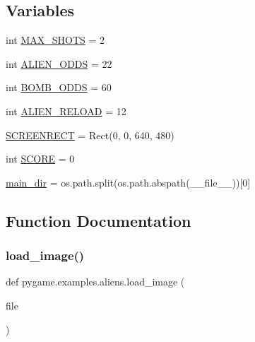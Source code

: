 \subsection*{Variables}
\begin{DoxyCompactItemize}
\item 
int \hyperlink{namespacepygame_1_1examples_1_1aliens_a154b9210c94f4af20213ae2c5ba9a51b}{M\+A\+X\+\_\+\+S\+H\+O\+TS} = 2
\item 
int \hyperlink{namespacepygame_1_1examples_1_1aliens_ab7162d937f2adf3ea08d52fedf2ed1d8}{A\+L\+I\+E\+N\+\_\+\+O\+D\+DS} = 22
\item 
int \hyperlink{namespacepygame_1_1examples_1_1aliens_aa1827272fa8644f492433c75393ce8ec}{B\+O\+M\+B\+\_\+\+O\+D\+DS} = 60
\item 
int \hyperlink{namespacepygame_1_1examples_1_1aliens_a76155022019dc6fc1fd138a035925859}{A\+L\+I\+E\+N\+\_\+\+R\+E\+L\+O\+AD} = 12
\item 
\hyperlink{namespacepygame_1_1examples_1_1aliens_a3d1e57c718a6a555e749345a76327e22}{S\+C\+R\+E\+E\+N\+R\+E\+CT} = Rect(0, 0, 640, 480)
\item 
int \hyperlink{namespacepygame_1_1examples_1_1aliens_a5d3d4b10aa667f7107c2378e99d9f4a3}{S\+C\+O\+RE} = 0
\item 
\hyperlink{namespacepygame_1_1examples_1_1aliens_a3e38c628a82cfe915a8db088f8dc7eaf}{main\+\_\+dir} = os.\+path.\+split(os.\+path.\+abspath(\+\_\+\+\_\+file\+\_\+\+\_\+))\mbox{[}0\mbox{]}
\end{DoxyCompactItemize}


\subsection{Function Documentation}
\mbox{\label{namespacepygame_1_1examples_1_1aliens_ac04f30879bdb0f1da7f9a42f37b2de4d}} 
\subsubsection{\texorpdfstring{load\+\_\+image()}{load\_image()}}
{\footnotesize\ttfamily def pygame.\+examples.\+aliens.\+load\+\_\+image (\begin{DoxyParamCaption}\item[{}]{file }\end{DoxyParamCaption})}

